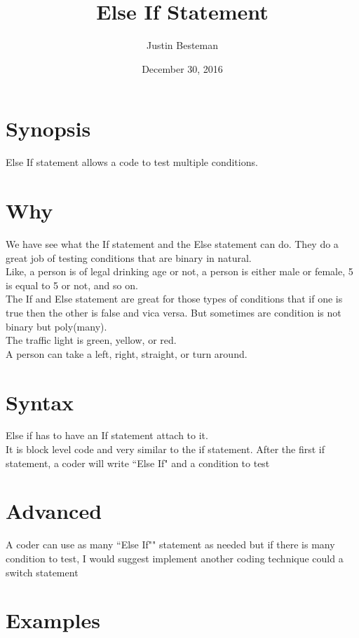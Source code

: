 \documentclass[12pt, letterpaper]{article}
\title{Else If Statement}
\author{Justin Besteman}
\date{December 30, 2016}
\begin{document}
\maketitle


\section*{Synopsis}

Else If statement allows a code to test multiple conditions.

\section*{Why}

We have see what the If statement and the Else statement can do. They do a great job of testing conditions that are binary in natural.\\
Like, a person is of legal drinking age or not, a person is either male or female, 5 is equal to 5 or not, and so on. \\
The If and Else statement are great for those types of conditions that if one is true then the other is false and vica versa.
But sometimes are condition is not binary but poly(many). \\
The traffic light is green, yellow, or red.\\
A person can take a left, right, straight, or turn around. \\

\section*{Syntax}

Else if has to have an If statement attach to it.\\
It is block level code and very similar to the if statement. After the first if statement, a coder will write ``Else If" and a condition to test

\section*{Advanced}

A coder can use as many ``Else If"" statement as needed but if there is many condition to test, I would suggest implement another coding technique could a switch statement

\section*{Examples}
\end{document}

